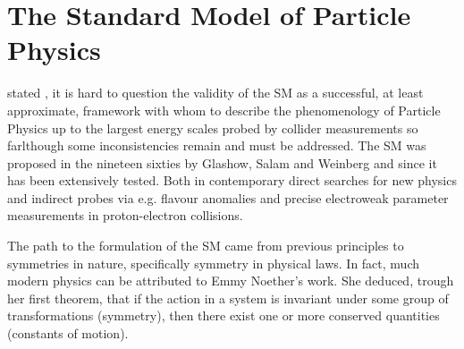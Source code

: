 
\chapter{The Standard Model of Particle Physics}\label{chapter:StandardModel}
%
%



 stated , it is hard to question the validity of the SM as a successful, at least approximate, framework with whom to describe the phenomenology of Particle Physics up to the largest energy scales probed by collider measurements so farlthough\Joaoadd{,} some inconsistencies remain and must be addressed.  
%
The SM was proposed in the nineteen sixties by Glashow, Salam and Weinberg  and since  it has been extensively tested. Both in contemporary direct searches for new physics and indirect probes via e.g. flavour anomalies and precise electroweak parameter measurements in proton-electron collisions.  %

The path to the formulation of the SM came from previous principles  to symmetries in nature, specifically symmetry in physical laws. 
%
In fact, much  modern physics can be attributed to Emmy Noether's work. She deduced, trough her first theorem, that if the action in a system is invariant under some group of transformations (symmetry), then there exist one or more conserved quantities (constants of motion). 

